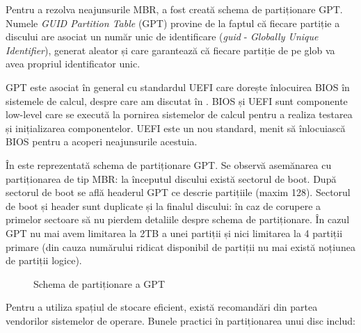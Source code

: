 Pentru a rezolva neajunsurile MBR, a fost creată schema de partiționare GPT.
Numele \textit{GUID Partition Table} (GPT) provine de la faptul că fiecare partiție a discului are asociat un număr unic de identificare (\textit{guid} - \textit{Globally Unique Identifier}), generat aleator și care garantează că fiecare partiție de pe glob va avea propriul identificator unic.

GPT este asociat în general cu standardul UEFI care dorește înlocuirea BIOS în sistemele de calcul, despre care am discutat în .
BIOS și UEFI sunt componente low-level care se execută la pornirea sistemelor de calcul pentru a realiza testarea și inițializarea componentelor.
UEFI este un nou standard, menit să înlocuiască BIOS pentru a acoperi neajunsurile acestuia.

În  este reprezentată schema de partiționare GPT.
Se observă asemănarea cu partiționarea de tip MBR: la începutul discului există sectorul de boot.
După sectorul de boot se află headerul GPT ce descrie partițiile (maxim 128).
Sectorul de boot și header sunt duplicate și la finalul discului: în caz de corupere a primelor sectoare să nu pierdem detaliile despre schema de partiționare.
În cazul GPT nu mai avem limitarea la 2TB a unei partiții și nici limitarea la 4 partiții primare (din cauza numărului ridicat disponibil de partiții nu mai există noțiunea de partiții logice).

\begin{figure}[htbp]
  \centering
  \def\svgwidth{\columnwidth}
  
  \caption{Schema de partiționare a GPT}
  \label{fig:storage:gpt}
\end{figure}

Pentru a utiliza spațiul de stocare eficient, există recomandări din partea vendorilor sistemelor de operare.
Bunele practici în partiționarea unui disc includ:

